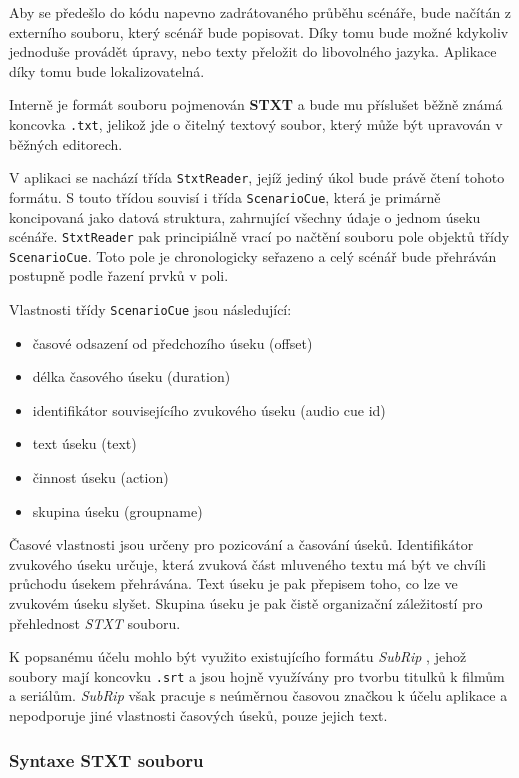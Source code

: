 Aby se předešlo do kódu napevno zadrátovaného průběhu scénáře, bude
načítán z externího souboru, který scénář bude popisovat. Díky tomu bude
možné kdykoliv jednoduše provádět úpravy, nebo texty přeložit do
libovolného jazyka. Aplikace díky tomu bude lokalizovatelná.

Interně je formát souboru pojmenován \textbf{STXT} a bude mu příslušet
běžně známá koncovka \texttt{.txt}, jelikož jde o čitelný textový
soubor, který může být upravován v běžných editorech.

V aplikaci se nachází třída \texttt{StxtReader}, jejíž jediný úkol bude
právě čtení tohoto formátu. S touto třídou souvisí i třída 
\texttt{ScenarioCue}, která je primárně koncipovaná jako datová
struktura, zahrnující všechny údaje o jednom úseku scénáře.
\texttt{StxtReader} pak principiálně vrací po načtění souboru pole objektů třídy
\texttt{ScenarioCue}. Toto pole je chronologicky seřazeno a celý scénář
bude přehráván postupně podle řazení prvků v poli.

Vlastnosti třídy \texttt{ScenarioCue} jsou následující:

\begin{itemize}
\tightlist
\item
  časové odsazení od předchozího úseku (offset)
\item
  délka časového úseku (duration)
\item
  identifikátor souvisejícího zvukového úseku (audio cue id)
\item
  text úseku (text)
\item
  činnost úseku (action)
\item
  skupina úseku (groupname)
\end{itemize}

Časové vlastnosti jsou určeny pro pozicování a časování úseků.
Identifikátor zvukového úseku určuje, která zvuková část mluveného textu má být ve
chvíli průchodu úsekem přehrávána. Text úseku je pak přepisem toho, co
lze ve zvukovém úseku slyšet. Skupina úseku je pak čistě organizační
záležitostí pro přehlednost \emph{STXT} souboru.

K popsanému účelu mohlo být využito existujícího formátu \emph{SubRip} \autocite{subrip},
jehož soubory mají koncovku \texttt{.srt} a jsou hojně využívány pro
tvorbu titulků k filmům a seriálům. \emph{SubRip} však pracuje s
neúměrnou časovou značkou k účelu aplikace a nepodporuje jiné vlastnosti
časových úseků, pouze jejich text.

\subsubsection{Syntaxe STXT souboru}\label{syntaxe-stxt-souboru}

